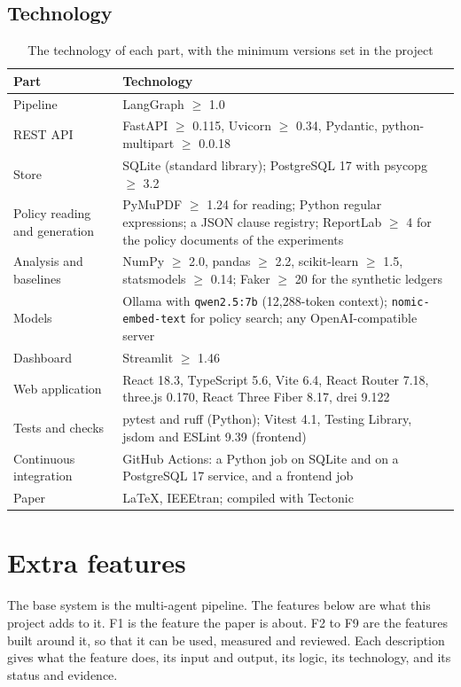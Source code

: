 \documentclass[11pt,a4paper]{article}
\begin{document}
\subsection{Technology}
\begin{table}[htbp]
\caption{The technology of each part, with the minimum versions set in the project}
\label{tab:tech}
\centering
\small
\begin{tabular}{L{3.6cm}L{12.1cm}}
\toprule
Part & Technology \\
\midrule
Pipeline & LangGraph $\geq$ 1.0 \\
REST API & FastAPI $\geq$ 0.115, Uvicorn $\geq$ 0.34, Pydantic, python-multipart $\geq$ 0.0.18 \\
Store & SQLite (standard library); PostgreSQL 17 with psycopg $\geq$ 3.2 \\
Policy reading and generation & PyMuPDF $\geq$ 1.24 for reading; Python regular expressions; a JSON clause registry; ReportLab $\geq$ 4 for the policy documents of the experiments \\
Analysis and baselines & NumPy $\geq$ 2.0, pandas $\geq$ 2.2, scikit-learn $\geq$ 1.5, statsmodels $\geq$ 0.14; Faker $\geq$ 20 for the synthetic ledgers \\
Models & Ollama with \texttt{qwen2.5:7b} (12,288-token context); \texttt{nomic-embed-text} for policy search; any OpenAI-compatible server \\
Dashboard & Streamlit $\geq$ 1.46 \\
Web application & React 18.3, TypeScript 5.6, Vite 6.4, React Router 7.18, three.js 0.170, React Three Fiber 8.17, drei 9.122 \\
Tests and checks & pytest and ruff (Python); Vitest 4.1, Testing Library, jsdom and ESLint 9.39 (frontend) \\
Continuous integration & GitHub Actions: a Python job on SQLite and on a PostgreSQL 17 service, and a frontend job \\
Paper & LaTeX, IEEEtran; compiled with Tectonic \\
\bottomrule
\end{tabular}
\end{table}

\section{Extra features}
\label{sec:features}
The base system is the multi-agent pipeline. The features below are what this project adds to it. F1 is the feature the paper is about. F2 to F9 are the features built around it, so that it can be used, measured and reviewed. Each description gives what the feature does, its input and output, its logic, its technology, and its status and evidence.
\end{document}
